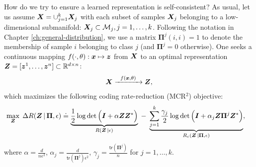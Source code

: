 \documentclass[../../book-main.tex]{subfiles}
\begin{document}
How do we try to ensure a learned representation is self-consistent? As usual, let us assume $\bm{X} = \cup_{j=1}^k \bm{X}_j$ with each subset of samples $\bm{X}_j$ belonging to a low-dimensional submanifold: $\bm{X}_j \subset \mathcal{M}_j, j = 1,\ldots, k$. Following the notation in Chapter \ref{ch:general-distribution}, we use a matrix $\bm \Pi^j(i,i) = 1$ to denote the membership of sample $i$ belonging to class $j$ (and $\bm \Pi^j = 0$ otherwise). One seeks a continuous mapping $f(\cdot,\theta): \bm{x} \mapsto \bm{z}$ from $\bm{X}$ to an optimal representation $\bm{Z} = [\bm{z}^1, \ldots, \bm{z}^n] \subset \mathbb{R}^{d \times n}$:
\begin{equation}
\bm X  \xrightarrow{\hspace{2mm} f(\bm{x}, \theta)\hspace{2mm}} \bm Z, 
\label{eqn:LDR}
\end{equation}
which maximizes the following coding rate-reduction (MCR$^2$) objective:
\begin{equation}\label{eq:mcr2-formulation}
\begin{split}
\max_{\Z} \; \Delta R(\Z\, | \, \bm{\Pi}, \epsilon) %
&\doteq \underbrace{\frac{1}{2}\log\det \Big(\I + {\alpha} \Z \Z^{*} \Big)}_{R(\Z\, | \epsilon)} \;-\; \underbrace{\sum_{j=1}^{k}\frac{\gamma_j}{2} \log\det\Big(\I + {\alpha_j} \Z \bm{\Pi}^{j} \Z^{*} \Big)}_{R_c(\Z \,|\bm \Pi, \epsilon)},
\end{split}
\end{equation}
where $\alpha=\frac{d}{n\epsilon^2}$, $\alpha_j=\frac{d}{\textsf{tr}(\bm{\Pi}^{j})\epsilon^2}$, $\gamma_j=\frac{\textsf{tr}(\bm{\Pi}^{j})}{n}$ for $j = 1,\ldots, k$.
\end{document}
